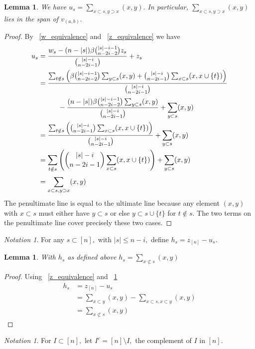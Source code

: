 \documentclass[10 pt]{amsart}
\theoremstyle{plain}
\newtheorem{lem}[thm]{Lemma}
\theoremstyle{definition}
\theoremstyle{remark}
\newtheorem{note}[thm]{Notation}
\numberwithin{equation}{section}
\begin{document}
\begin{lem}
\label{u_equivalence}
We have $u_s = \sum_{x\subset s,y\supset x}^{}(x, y).$ In particular, $\sum_{x\subset s,y\supset x}^{}(x, y)$ lies in the span of $v_{(a, b)}.$
\end{lem}
\begin{proof}
By ~\ref{w_equivalence} and ~\ref{z_equivalence} we have
\begin{align*}
	u_s &= \frac{w_s - (n - |s|)\beta \binom {|s|-i-1}{n-2i-2} z_s}{\binom {|s|-i}{n-2i-1}} + z_s\\
	&= \frac{\sum_{t\notin s}^{} \left(\beta \binom {|s|-i-1}{n-2i-2}\sum_{y \subset s}^{}(x, y) + \binom {|s|-i}{n-2i-1}\sum_{x \subset s}^{}(x, x \cup \{t\}) \right)}{\binom {|s|-i}{n-2i-1}} 
	\\
	& \hspace{1 cm}- \frac{(n - |s|)\beta \binom {|s|-i-1}{n-2i-2} \sum_{y \subset s}^{}(x, y)}{\binom {|s|-i}{n-2i-1}}+ \sum_{y \subset s}^{}(x, y) \\
	&=  \frac{\sum_{t\notin s}^{} \left(\binom {|s|-i}{n-2i-1}\sum_{x \subset s}^{}(x, x \cup \{t\}) \right)}{\binom {|s|-i}{n-2i-1}} + \sum_{y \subset s}^{}(x, y) \\
	&= \sum_{t\notin s}^{} \left(\binom {|s|-i}{n-2i-1}\sum_{x \subset s}^{}(x, x \cup \{t\}) \right) + \sum_{y \subset s}^{}(x, y) \\
	&=  \sum_{x\subset s,y\supset x}^{}(x, y)
\end{align*}
The penultimate line is equal to the ultimate line because any element $(x, y)$ with $x \subset s$ must either have $y \subset s$ or else $y \subset s \cup \{t\}$ for $t \notin s.$ The two terms on the penultimate line cover precisely these two cases.
\end{proof}

\begin{note}
For any $s \subset [n],$ with $|s| \leq n-i,$ define $h_s = z_{[n]} - u_s.$
\end{note}

\begin{lem}
\label{h_equivalence}
With $h_s$ as defined above $h_s = \sum_{x\not\subset s}^{}(x, y)$
\end{lem}
\begin{proof}
Using ~\ref{z_equivalence} and ~\ref{u_equivalence}
\begin{align*}
	h_s &= z_{[n]} - u_s \\
	&= \sum_{x\subset y}^{}(x, y)-\sum_{x\subset s,x\subset y}^{}(x, y)\\
	&= \sum_{x\not\subset s}^{}(x, y)
\end{align*}
\end{proof}
\begin{note}
For $I \subset[n],$ let $I^c = [n]\setminus I,$ the complement of $I$ in $[n].$
\end{note}
\end{document}
